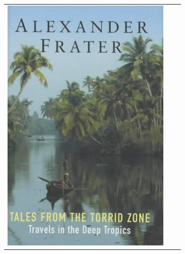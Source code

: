 \documentclass[conference]{IEEEtran}
\begin{document}
\begin{table}[hbtp]
\begin{center}
\begin{tabular}{c c c}
  \includegraphics[scale=0.2]{pics/results_image/4.jpeg} \\ 

  \end{tabular}
\end{center}
\label{testtab}
\end{table}
\end{document}

